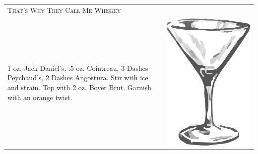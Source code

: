 \documentclass{article}
\begin{document}
\begin{multicols}{2}
\begin{tabular}{p{2in} p{0.5in}}
\multicolumn{2}{p{3in}}{\centering\Huge\textsc{That's Why They Call Me Whiskey}} \\ 
  \vspace{-0.1in}1 oz. Jack Daniel's, .5 oz. Cointreau, 3 Dashes Peychaud's, 2 Dashes Angostura. Stir with ice and strain. Top with 2 oz. Boyer Brut. Garnish with an orange twist. &
   \vspace{-0.1in} \includegraphics{goblet.png}
\end{tabular}


\end{multicols}
\end{document}
